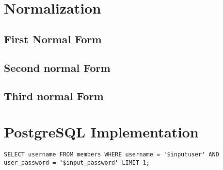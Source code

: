 \documentclass[titlepage ,12pt]{article}
\begin{document}
\section{Normalization}
\subsection{First Normal Form}
\subsection{Second normal Form}
\subsection{Third normal Form}

\section{PostgreSQL Implementation}

\begin{lstlisting}[breaklines=true]
  SELECT username FROM members WHERE username = '$inputuser' AND user_password = '$input_password' LIMIT 1;
\end{lstlisting}
\end{document}
